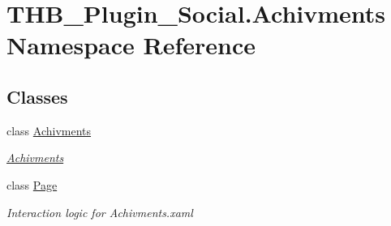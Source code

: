 \hypertarget{namespace_t_h_b___plugin___social_1_1_achivments}{}\section{T\+H\+B\+\_\+\+Plugin\+\_\+\+Social.\+Achivments Namespace Reference}
\label{namespace_t_h_b___plugin___social_1_1_achivments}
\subsection*{Classes}
\begin{DoxyCompactItemize}
\item 
class \mbox{\hyperlink{class_t_h_b___plugin___social_1_1_achivments_1_1_achivments}{Achivments}}
\begin{DoxyCompactList}\small\item\em \mbox{\hyperlink{class_t_h_b___plugin___social_1_1_achivments_1_1_achivments}{Achivments}} \end{DoxyCompactList}\item 
class \mbox{\hyperlink{class_t_h_b___plugin___social_1_1_achivments_1_1_page}{Page}}
\begin{DoxyCompactList}\small\item\em Interaction logic for Achivments.\+xaml \end{DoxyCompactList}\end{DoxyCompactItemize}

